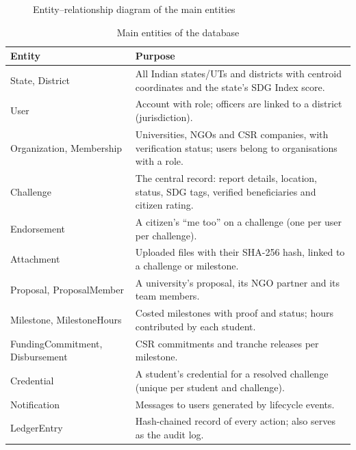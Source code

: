 \begin{figure}[H]
\caption{Entity--relationship diagram of the main entities}
\label{fig:er}
\end{figure}

\begin{table}[H]
\centering
\caption{Main entities of the database}
\label{tab:entities}
\small
\begin{tabularx}{\textwidth}{@{}L{3.6cm}X@{}}
\toprule
\textbf{Entity} & \textbf{Purpose} \\
\midrule
State, District & All Indian states/UTs and districts with centroid coordinates and the state's SDG Index score. \\
User & Account with role; officers are linked to a district (jurisdiction). \\
Organization, Membership & Universities, NGOs and CSR companies, with verification status; users belong to organisations with a role. \\
Challenge & The central record: report details, location, status, SDG tags, verified beneficiaries and citizen rating. \\
Endorsement & A citizen's ``me too'' on a challenge (one per user per challenge). \\
Attachment & Uploaded files with their SHA-256 hash, linked to a challenge or milestone. \\
Proposal, ProposalMember & A university's proposal, its NGO partner and its team members. \\
Milestone, MilestoneHours & Costed milestones with proof and status; hours contributed by each student. \\
FundingCommitment, Disbursement & CSR commitments and tranche releases per milestone. \\
Credential & A student's credential for a resolved challenge (unique per student and challenge). \\
Notification & Messages to users generated by lifecycle events. \\
LedgerEntry & Hash-chained record of every action; also serves as the audit log. \\
\bottomrule
\end{tabularx}
\end{table}


